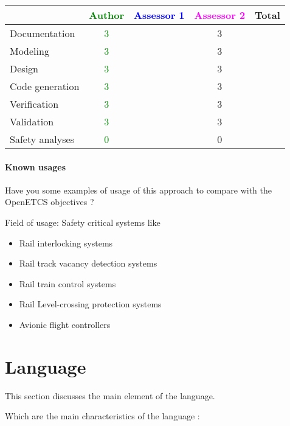 \begin{tabular}{|l | c | c | c | c|}
\hline
& \textcolor{green}{Author} & \textcolor{blue}{Assessor 1} & \textcolor{magenta}{Assessor 2} & Total \\
\hline 
Documentation &  \textcolor{green}{3}  & &3 &  \\
\hline
Modeling &  \textcolor{green}{3}  & &3 &  \\
\hline
Design &  \textcolor{green}{3}  & &3 & \\
\hline
Code generation &  \textcolor{green}{3}  & &3 & \\
\hline
Verification &  \textcolor{green}{3}  & &3 & \\
\hline
Validation &  \textcolor{green}{3}  & &3 & \\
\hline
Safety analyses &  \textcolor{green}{0}  & &0 & \\
\hline
\end{tabular}

\paragraph{Known usages} Have you some examples of usage of this approach to  compare with the OpenETCS objectives ?

Field of usage: Safety critical systems like
\begin{itemize}
	\item Rail interlocking systems
	\item Rail track vacancy detection systems
	\item Rail train control systems
	\item Rail Level-crossing protection systems
	\item Avionic flight controllers
\end{itemize}

\section{Language}
This section discusses the main element of the language.

Which are the main characteristics of the language :

